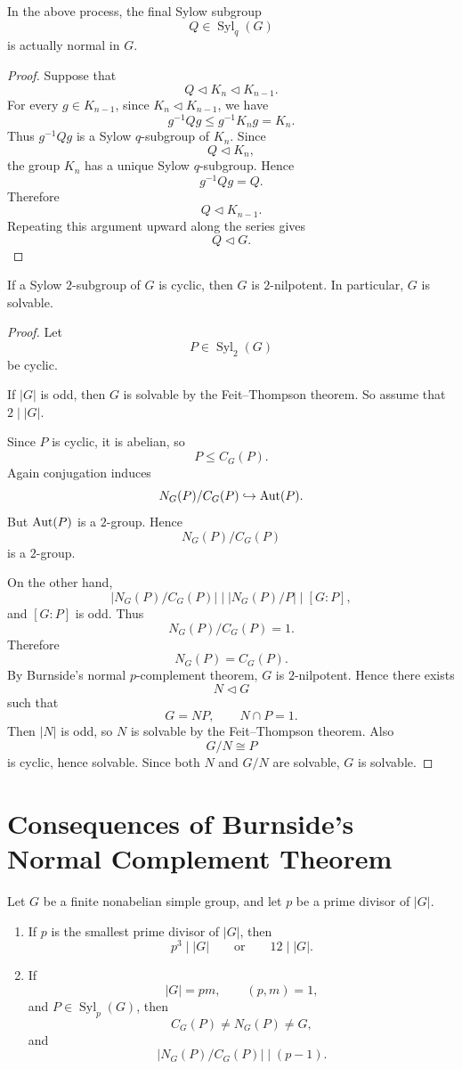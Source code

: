 \begin{remark}
In the above process, the final Sylow subgroup
\[
    Q\in \operatorname{Syl}_q(G)
\]
is actually normal in $G$.
\end{remark}

\begin{proof}
Suppose that
\[
    Q\lhd K_n\lhd K_{n-1}.
\]
For every $g\in K_{n-1}$, since $K_n\lhd K_{n-1}$, we have
\[
    g^{-1}Qg\leq g^{-1}K_n g=K_n.
\]
Thus $g^{-1}Qg$ is a Sylow $q$-subgroup of $K_n$. Since
\[
    Q\lhd K_n,
\]
the group $K_n$ has a unique Sylow $q$-subgroup. Hence
\[
    g^{-1}Qg=Q.
\]
Therefore
\[
    Q\lhd K_{n-1}.
\]
Repeating this argument upward along the series gives
\[
    Q\lhd G.
\]
\end{proof}

\begin{corollary}
If a Sylow $2$-subgroup of $G$ is cyclic, then $G$ is $2$-nilpotent. In particular, $G$ is solvable.
\end{corollary}

\begin{proof}
Let
\[
    P\in \operatorname{Syl}_2(G)
\]
be cyclic.

If $|G|$ is odd, then $G$ is solvable by the Feit--Thompson theorem. So assume that $2\mid |G|$.

Since $P$ is cyclic, it is abelian, so
\[
    P\leq C_G(P).
\]
Again conjugation induces
\[
    N_G(P)/C_G(P)\hookrightarrow \operatorname{Aut}(P).
\]
But $\operatorname{Aut}(P)$ is a $2$-group. Hence
\[
    N_G(P)/C_G(P)
\]
is a $2$-group.

On the other hand,
\[
    |N_G(P)/C_G(P)|
    \mid
    |N_G(P)/P|
    \mid
    [G:P],
\]
and $[G:P]$ is odd. Thus
\[
    N_G(P)/C_G(P)=1.
\]
Therefore
\[
    N_G(P)=C_G(P).
\]
By Burnside's normal $p$-complement theorem, $G$ is $2$-nilpotent. Hence there exists
\[
    N\lhd G
\]
such that
\[
    G=NP,
    \qquad
    N\cap P=1.
\]
Then $|N|$ is odd, so $N$ is solvable by the Feit--Thompson theorem. Also
\[
    G/N\cong P
\]
is cyclic, hence solvable. Since both $N$ and $G/N$ are solvable, $G$ is solvable.
\end{proof}

\section{Consequences of Burnside's Normal Complement Theorem}

\begin{proposition}
Let $G$ be a finite nonabelian simple group, and let $p$ be a prime divisor of $|G|$.
\begin{enumerate}[label=(\arabic*)]
    \item If $p$ is the smallest prime divisor of $|G|$, then
    \[
        p^3\mid |G|
        \qquad\text{or}\qquad
        12\mid |G|.
    \]
    \item If
    \[
        |G|=pm,
        \qquad
        (p,m)=1,
    \]
    and $P\in \operatorname{Syl}_p(G)$, then
    \[
        C_G(P)\neq N_G(P)\neq G,
    \]
    and
    \[
        \left|N_G(P)/C_G(P)\right|\mid (p-1).
    \]
\end{enumerate}
\end{proposition}

